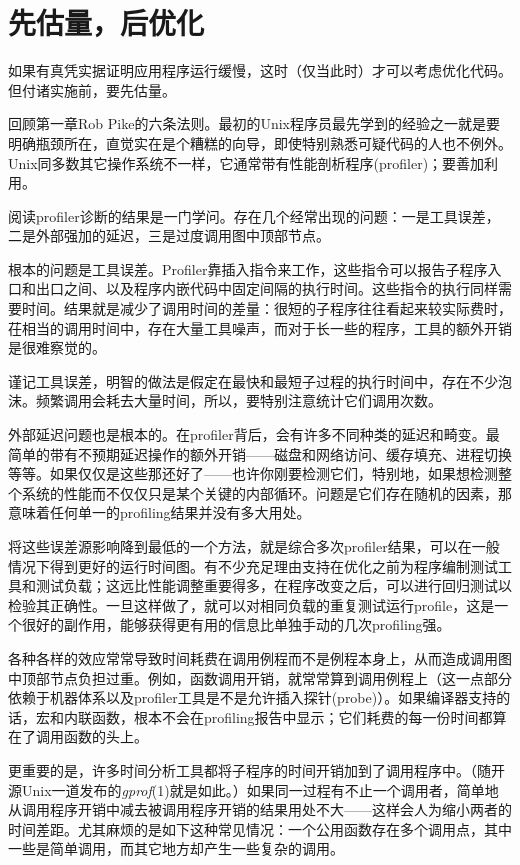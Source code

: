 \documentclass[12pt,oneside]{book}
\begin{document}
\section{先估量，后优化}
如果有真凭实据证明应用程序运行缓慢，这时（仅当此时）才可以考虑优化代码。但付诸实施前，要先估量。

回顾第一章Rob Pike的六条法则。最初的Unix程序员最先学到的经验之一就是要明确瓶颈所在，直觉实在是个糟糕的向导，即使特别熟悉可疑代码的人也不例外。Unix同多数其它操作系统不一样，它通常带有性能剖析程序(profiler)；要善加利用。

阅读profiler诊断的结果是一门学问。存在几个经常出现的问题：一是工具误差，二是外部强加的延迟，三是过度调用图中顶部节点。

根本的问题是工具误差。Profiler靠插入指令来工作，这些指令可以报告子程序入口和出口之间、以及程序内嵌代码中固定间隔的执行时间。这些指令的执行同样需要时间。结果就是减少了调用时间的差量：很短的子程序往往看起来较实际费时，茌相当的调用时间中，存在大量工具噪声，而对于长一些的程序，工具的额外开销是很难察觉的。

谨记工具误差，明智的做法是假定在最快和最短子过程的执行时间中，存在不少泡沫。频繁调用会耗去大量时间，所以，要特别注意统计它们调用次数。

外部延迟问题也是根本的。在profiler背后，会有许多不同种类的延迟和畸变。最简单的带有不预期延迟操作的额外开销——磁盘和网络访问、缓存填充、进程切换等等。如果仅仅是这些那还好了——也许你刚要检测它们，特别地，如果想检测整个系统的性能而不仅仅只是某个关键的内部循环。问题是它们存在随机的因素，那意味着任何单一的profiling结果并没有多大用处。

将这些误差源影响降到最低的一个方法，就是综合多次profiler结果，可以在一般情况下得到更好的运行时间图。有不少充足理由支持在优化之前为程序编制测试工具和测试负载；这远比性能调整重要得多，在程序改变之后，可以进行回归测试以检验其正确性。一旦这样做了，就可以对相同负载的重复测试运行profile，这是一个很好的副作用，能够获得更有用的信息比单独手动的几次profiling强。

各种各样的效应常常导致时间耗费在调用例程而不是例程本身上，从而造成调用图中顶部节点负担过重。例如，函数调用开销，就常常算到调用例程上（这一点部分依赖于机器体系以及profiler工具是不是允许插入探针(probe)）。如果编译器支持的话，宏和内联函数，根本不会在profiling报告中显示；它们耗费的每一份时间都算在了调用函数的头上。

更重要的是，许多时间分析工具都将子程序的时间开销加到了调用程序中。（随开源Unix一道发布的\textit{gprof}(1)就是如此。）如果同一过程有不止一个调用者，简单地从调用程序开销中减去被调用程序开销的结果用处不大——这样会人为缩小两者的时间差距。尤其麻烦的是如下这种常见情况：一个公用函数存在多个调用点，其中一些是简单调用，而其它地方却产生一些复杂的调用。
\end{document}
